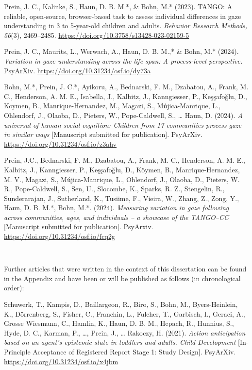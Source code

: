 \documentclass[
]{scrbook}
\begin{document}
Prein, J. C., Kalinke, S., Haun, D. B. M.*, \& Bohn, M.* (2023). TANGO: A reliable, open-source, browser-based task to assess individual differences in gaze understanding in 3 to 5-year-old children and adults. \emph{Behavior Research Methods, 56}(3), 2469--2485. \mbox{\url{https://doi.org/10.3758/s13428-023-02159-5}}

Prein, J. C., Maurits, L., Werwach, A., Haun, D. B. M.,* \& Bohn, M.* (2024). \emph{Variation in gaze understanding across the life span: A process-level perspective.} PsyArXiv. \mbox{\url{https://doi.org/10.31234/osf.io/dy73a}}

Bohn, M.*, Prein, J. C.*, Ayikoru, A., Bednarski, F. M., Dzabatou, A., Frank, M. C., Henderson, A. M. E., Isabella, J., Kalbitz, J., Kanngiesser, P., Keşşafoğlu, D., Koymen, B., Manrique-Hernandez, M., Magazi, S., Mújica-Manrique, L., Ohlendorf, J., Olaoba, D., Pieters, W., Pope-Caldwell, S., \ldots{} Haun, D. (2024). \emph{A universal of human social cognition: Children from 17 communities process gaze in similar ways} {[}Manuscript submitted for publication{]}. PsyArXiv. \mbox{\url{https://doi.org/10.31234/osf.io/z3ahv}}

Prein, J.C., Bednarski, F. M., Dzabatou, A., Frank, M. C., Henderson, A. M. E., Kalbitz, J., Kanngiesser, P., Keşşafoğlu, D., Köymen, B., Manrique-Hernandez, M. V., Magazi, S., Mújica-Manrique, L., Ohlendorf, J., Olaoba, D., Pieters, W. R., Pope-Caldwell, S., Sen, U., Slocombe, K., Sparks, R. Z., Stengelin, R., Sunderarajan, J., Sutherland, K., Tusiime, F., Vieira, W., Zhang, Z., Zong, Y., Haun, D. B. M.*, Bohn, M.*. (2024). \emph{Measuring variation in gaze following across communities, ages, and individuals -- a showcase of the TANGO--CC} {[}Manuscript submitted for publication{]}. PsyArxiv. \mbox{\url{https://doi.org/10.31234/osf.io/fcq2g}}

~

Further articles that were written in the context of this dissertation can be found in the Appendix and have been or will be published as follows (in chronological order):

Schuwerk, T., Kampis, D., Baillargeon, R., Biro, S., Bohn, M., Byers-Heinlein, K., Dörrenberg, S., Fisher, C., Franchin, L., Fulcher, T., Garbisch, I., Geraci, A., Grosse Wiesmann, C., Hamlin, K., Haun, D. B. M., Hepach, R., Hunnius, S., Hyde, D. C., Karman, P., \ldots, Prein, J., \ldots{} Rakoczy, H. (2021). \emph{Action anticipation based on an agent's epistemic state in toddlers and adults. Child Development} {[}In-Principle Acceptance of Registered Report Stage 1: Study Design{]}. PsyArXiv. \mbox{\url{https://doi.org/10.31234/osf.io/x4jbm}}
\end{document}
